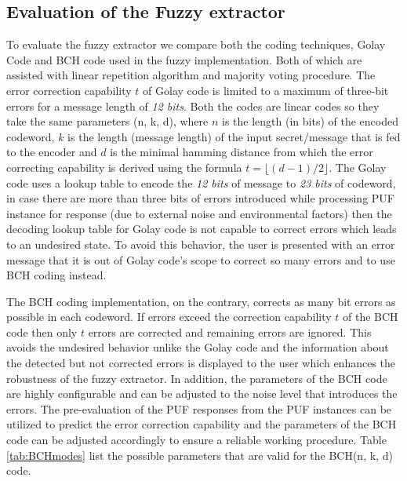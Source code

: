 \subsection{Evaluation of the Fuzzy extractor}
To evaluate the fuzzy extractor we compare both the coding techniques, Golay Code and BCH code used in the fuzzy implementation. Both of which are assisted with linear repetition algorithm and majority voting procedure. The error correction capability $t$ of Golay code is limited to a maximum of three-bit errors for a message length of \emph{12 bits}. Both the codes are linear codes so they take the same parameters (n, k, d), where $n$ is the length (in bits) of the encoded codeword, $k$ is the
length (message length) of the input secret/message that is fed to the encoder and $d$ is the minimal hamming distance from which the error correcting capability is derived using the formula $t = \lfloor(d-1)/2\rfloor$. The Golay code uses a lookup table to encode the \emph{12 bits} of message to \emph{23 bits} of codeword, in case there are more than three bits of errors introduced while processing PUF instance for response (due to external noise and environmental factors) then the decoding lookup
table for Golay code is not capable to correct errors which leads to an undesired state. To avoid this behavior, the user is presented with an error message that it is out of Golay code's scope to correct so many errors and to use BCH coding instead.

The BCH coding implementation, on the contrary, corrects as many bit errors as possible in each codeword. If errors exceed the correction capability $t$ of the BCH code then only $t$ errors are corrected and remaining errors are ignored. This avoids the undesired behavior unlike the Golay code and the information about the detected but not corrected errors is displayed to the user which enhances the robustness of the fuzzy extractor. In addition, the parameters of the BCH code are
highly configurable and can be adjusted to the noise level that introduces the errors. The pre-evaluation of the PUF responses from the PUF instances can be utilized to predict the error correction capability and the parameters of the BCH code can be adjusted accordingly to ensure a reliable working procedure. Table \ref{tab:BCHmodes} list the possible parameters that are valid for the BCH(n, k, d) code.\\

